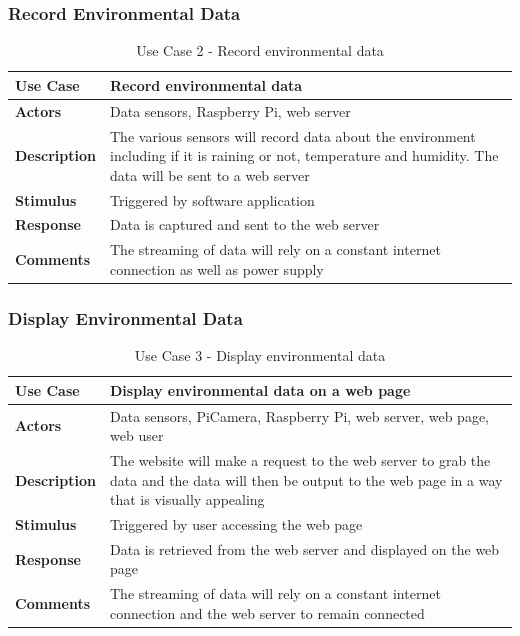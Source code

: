 \documentclass[10pt,a4paper]{article}
\begin{document}
\subsubsection{Record Environmental Data}
\begin{table}[h!]
\centering
\begin{tabular}{p{2cm}p{9cm}}
\toprule
\textbf{Use Case}    & Record environmental data                                                                          \\ \midrule
\textbf{Actors}      & Data sensors, Raspberry Pi, web server                                                                          \\
\textbf{Description} & The various sensors will record data about the environment including if it is raining or not, temperature and humidity. The data will be sent to a web server         \\
\textbf{Stimulus}    & Triggered by software application\\
\textbf{Response}    & Data is captured and sent to the web server              \\
\textbf{Comments}    & The streaming of data will rely on a constant internet connection as well as power supply \\ \bottomrule
\end{tabular}
\caption{Use Case 2 - Record environmental data}
\label{tab:useCase1}
\end{table}

\subsubsection{Display Environmental Data}
\begin{table}[h!]
\centering
\begin{tabular}{p{2cm}p{9cm}}
\toprule
\textbf{Use Case}    & Display environmental data on a web page \\ \midrule
\textbf{Actors}      & Data sensors, PiCamera, Raspberry Pi, web server, web page, web user                                                                          \\
\textbf{Description} & The website will make a request to the web server to grab the data and the data will then be output to the web page in a way that is visually appealing         \\
\textbf{Stimulus}    & Triggered by user accessing the web page\\
\textbf{Response}    & Data is retrieved from the web server and displayed on the web page              \\
\textbf{Comments}    & The streaming of data will rely on a constant internet connection and the web server to remain connected \\ \bottomrule
\end{tabular}
\caption{Use Case 3 - Display environmental data}
\label{tab:useCase3}
\end{table}
\end{document}
